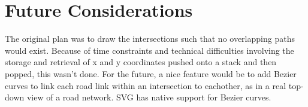 \documentclass{article}
\begin{document}
\section{Future Considerations}

The original plan was to draw the intersections such that no overlapping paths would exist. Because of time constraints and technical difficulties involving the storage and retrieval of x and y coordinates pushed onto a stack and then popped, this wasn't done. For the future, a nice feature would be to add Bezier curves to link each road link within an intersection to eachother, as in a real top-down view of a road network. SVG has native support for Bezier curves.
\end{document}
